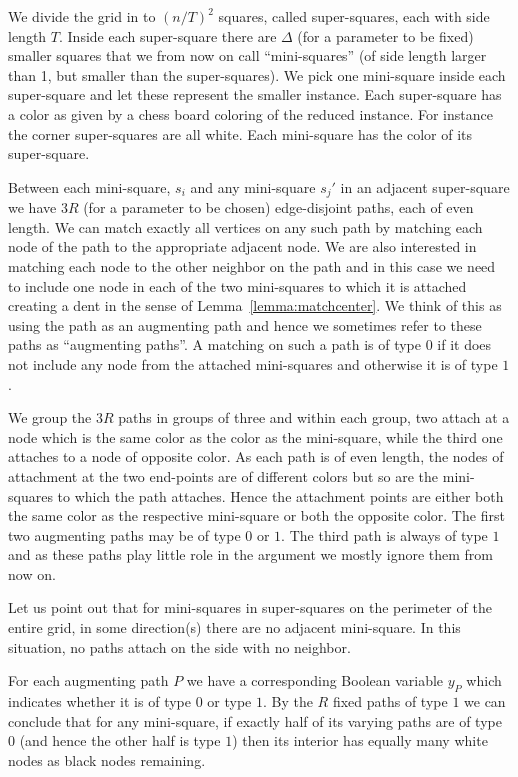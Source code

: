 \documentclass{theoretics}
\begin{document}
We divide the grid in to  $(n/T)^2$ squares, called super-squares,
each with side length $T$.  Inside each super-square 
there are $\Delta$ (for a parameter to be fixed) smaller squares that we from
now on call ``mini-squares'' (of side length larger than 1, but
smaller than the super-squares).  We pick one
mini-square inside each super-square and let these represent
the smaller instance.  Each super-square has a color as given
by a chess board coloring of the reduced instance.  For instance
the corner super-squares are all white.  Each mini-square has
the color of its super-square.

Between each mini-square, $s_i$ and any mini-square
$s_j'$ in an adjacent super-square we have $3R$ (for a parameter to
be chosen) edge-disjoint paths,
each of even length.  We can match exactly all vertices on any such
path by matching each node of the path to the appropriate adjacent
node.  We are also interested in matching each node to the other neighbor
on the path and in this case we need to include 
one node in each of the two mini-squares
to which it is attached creating a dent in the
sense of Lemma~\ref{lemma:matchcenter}.
We think of this as using
the path as an augmenting path and hence we sometimes refer to these
paths as ``augmenting paths''.  A matching on such a path is of
type $0$ if it does not include any node from the attached
mini-squares and otherwise it is of type $1$. 

We group
the $3R$ paths in groups of three and within each
group, two attach at a node which is the same color as
the color as the mini-square, while the third one
attaches to a node of opposite color.  
As each path is of even length, the nodes of
attachment at the two end-points are of different colors but so are the
mini-squares to which the path attaches.  Hence
the  attachment points are either both the same color as
the respective mini-square or both the opposite color.
The first two augmenting paths
may be of type $0$ or $1$.  The third path is always of
type $1$ and as these paths play little role in the argument
we mostly ignore them from now on.

Let us point out that for mini-squares in super-squares on the perimeter of the
entire grid, in some direction(s) there are no adjacent 
mini-square.  In this situation, no paths attach on the
side with no neighbor.

For each augmenting path $P$ we have a corresponding Boolean
variable $y_P$ which indicates whether it is of type $0$
or type $1$.  By the $R$ fixed paths of type $1$
we can conclude that for any mini-square, if
exactly half of its varying  paths are of type $0$ (and
hence the other half is type $1$) then its interior
has equally many white nodes as black
nodes remaining.  
\end{document}
